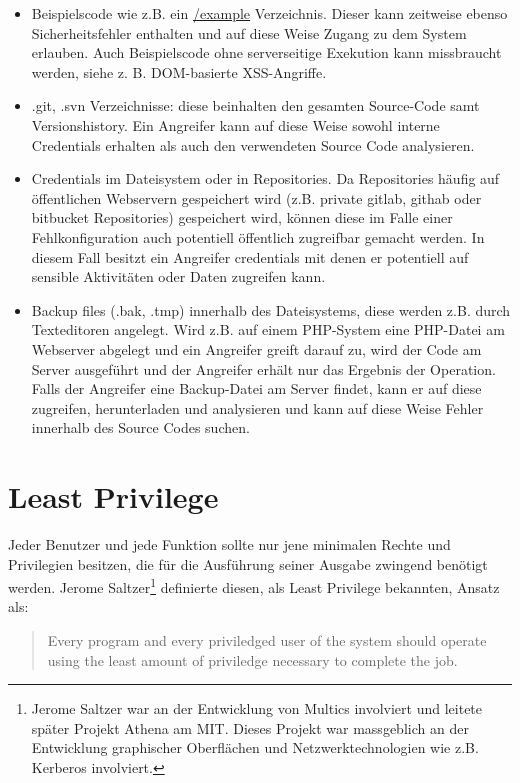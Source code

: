 \begin{itemize}
	\item Beispielscode wie z.B. ein \url{/example} Verzeichnis. Dieser kann zeitweise ebenso Sicherheitsfehler enthalten und auf diese Weise Zugang zu dem System erlauben. Auch Beispielscode ohne serverseitige Exekution kann missbraucht werden, siehe z. B. DOM-basierte XSS-Angriffe.
	\item .git, .svn Verzeichnisse: diese beinhalten den gesamten Source-Code samt Versionshistory. Ein Angreifer kann auf diese Weise sowohl interne Credentials erhalten als auch den verwendeten Source Code analysieren.
	\item Credentials im Dateisystem oder in Repositories. Da Repositories häufig auf öffentlichen Webservern gespeichert wird (z.B. private gitlab, githab oder bitbucket Repositories) gespeichert wird, können diese im Falle einer Fehlkonfiguration auch potentiell öffentlich zugreifbar gemacht werden. In diesem Fall besitzt ein Angreifer credentials mit denen er potentiell auf sensible Aktivitäten oder Daten zugreifen kann.
	\item Backup files (.bak, .tmp) innerhalb des Dateisystems, diese werden z.B. durch Texteditoren angelegt. Wird z.B. auf einem PHP-System eine PHP-Datei am Webserver abgelegt und ein Angreifer greift darauf zu, wird der Code am Server ausgeführt und der Angreifer erhält nur das Ergebnis der Operation. Falls der Angreifer eine Backup-Datei am Server findet, kann er auf diese zugreifen, herunterladen und analysieren und kann auf diese Weise Fehler innerhalb des Source Codes suchen.
\end{itemize}

\section{Least Privilege}

Jeder Benutzer und jede Funktion sollte nur jene minimalen Rechte und Privilegien besitzen, die für die Ausführung seiner Ausgabe zwingend benötigt werden. Jerome Saltzer\footnote{Jerome Saltzer war an der Entwicklung von Multics involviert und leitete später Projekt Athena am MIT. Dieses Projekt war massgeblich an der Entwicklung graphischer Oberflächen und Netzwerktechnologien wie z.B. Kerberos involviert.} definierte diesen, als Least Privilege bekannten, Ansatz als:

\begin{quote}
Every program and every priviledged user of the system should operate using the least amount of priviledge necessary to complete the job.
\end{quote}

